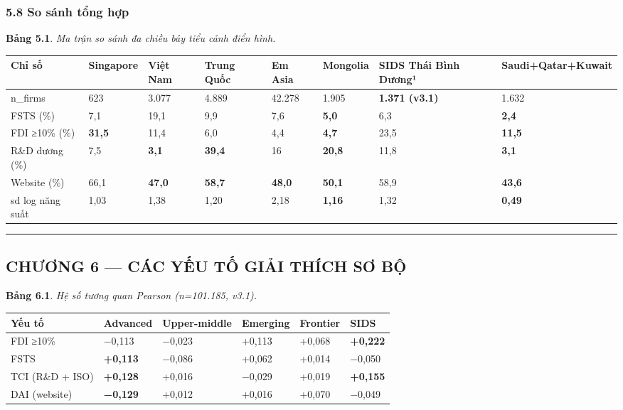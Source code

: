 \documentclass[12pt,a4paper]{article}
\begin{document}
\hypertarget{58-so-suxe1nh-tux1ed5ng-hux1ee3p}{%
\subsubsection{5.8 So sánh tổng
hợp}\label{58-so-suxe1nh-tux1ed5ng-hux1ee3p}}

\textbf{Bảng 5.1}. \emph{Ma trận so sánh đa chiều bảy tiểu cảnh điển
hình.}

\begin{longtable}[]{@{}llllllll@{}}
\toprule\noalign{}
Chỉ số & Singapore & Việt Nam & Trung Quốc & Em Asia & Mongolia & SIDS
Thái Bình Dương¹ & Saudi+Qatar+Kuwait \\
\midrule\noalign{}
\endhead
\bottomrule\noalign{}
\endlastfoot
n\_firms & 623 & 3.077 & 4.889 & 42.278 & 1.905 & \textbf{1.371 (v3.1)}
& 1.632 \\
FSTS (\%) & 7,1 & 19,1 & 9,9 & 7,6 & \textbf{5,0} & 6,3 &
\textbf{2,4} \\
FDI ≥10\% (\%) & \textbf{31,5} & 11,4 & 6,0 & 4,4 & \textbf{4,7} & 23,5
& \textbf{11,5} \\
R\&D dương (\%) & 7,5 & \textbf{3,1} & \textbf{39,4} & 16 &
\textbf{20,8} & 11,8 & \textbf{3,1} \\
Website (\%) & 66,1 & \textbf{47,0} & \textbf{58,7} & \textbf{48,0} &
\textbf{50,1} & 58,9 & \textbf{43,6} \\
sd log năng suất & 1,03 & 1,38 & 1,20 & 2,18 & \textbf{1,16} & 1,32 &
\textbf{0,49} \\
\end{longtable}

\begin{center}\rule{0.5\linewidth}{0.5pt}\end{center}

\hypertarget{chux1b0ux1a1ng-6--cuxe1c-yux1ebfu-tux1ed1-giux1ea3i-thuxedch-sux1a1-bux1ed9}{%
\subsection{CHƯƠNG 6 --- CÁC YẾU TỐ GIẢI THÍCH SƠ
BỘ}\label{chux1b0ux1a1ng-6--cuxe1c-yux1ebfu-tux1ed1-giux1ea3i-thuxedch-sux1a1-bux1ed9}}

\textbf{Bảng 6.1}. \emph{Hệ số tương quan Pearson (n=101.185, v3.1).}

\begin{longtable}[]{@{}llllll@{}}
\toprule\noalign{}
Yếu tố & Advanced & Upper-middle & Emerging & Frontier & SIDS \\
\midrule\noalign{}
\endhead
\bottomrule\noalign{}
\endlastfoot
FDI ≥10\% & −0,113 & −0,023 & +0,113 & +0,068 & \textbf{+0,222} \\
FSTS & \textbf{+0,113} & −0,086 & +0,062 & +0,014 & −0,050 \\
TCI (R\&D + ISO) & \textbf{+0,128} & +0,016 & −0,029 & +0,019 &
\textbf{+0,155} \\
DAI (website) & \textbf{−0,129} & +0,012 & +0,016 & +0,070 & −0,049 \\
\end{longtable}
\end{document}
